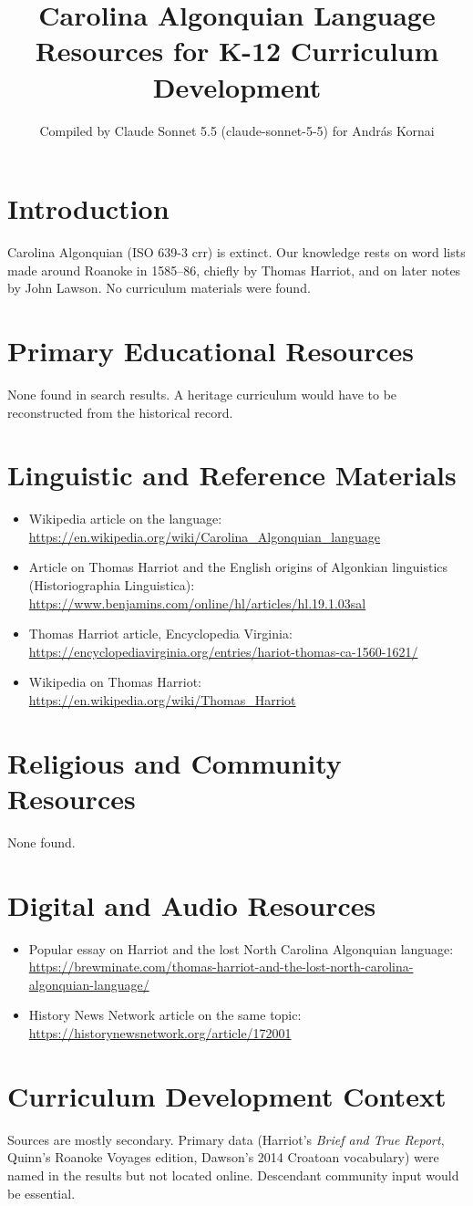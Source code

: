 \documentclass[12pt]{article}
\title{Carolina Algonquian Language Resources for K-12 Curriculum Development}
\author{Compiled by Claude Sonnet 5.5 (claude-sonnet-5-5) for Andr\'as Kornai}
\date{}
\begin{document}
\maketitle
\section{Introduction}
Carolina Algonquian (ISO 639-3 crr) is extinct. Our knowledge rests on word lists made around Roanoke in 1585--86, chiefly by Thomas Harriot, and on later notes by John Lawson. No curriculum materials were found.
\section{Primary Educational Resources}
None found in search results. A heritage curriculum would have to be reconstructed from the historical record.
\section{Linguistic and Reference Materials}
\begin{itemize}
\item Wikipedia article on the language: \url{https://en.wikipedia.org/wiki/Carolina_Algonquian_language}
\item Article on Thomas Harriot and the English origins of Algonkian linguistics (Historiographia Linguistica): \url{https://www.benjamins.com/online/hl/articles/hl.19.1.03sal}
\item Thomas Harriot article, Encyclopedia Virginia: \url{https://encyclopediavirginia.org/entries/hariot-thomas-ca-1560-1621/}
\item Wikipedia on Thomas Harriot: \url{https://en.wikipedia.org/wiki/Thomas_Harriot}
\end{itemize}
\section{Religious and Community Resources}
None found.
\section{Digital and Audio Resources}
\begin{itemize}
\item Popular essay on Harriot and the lost North Carolina Algonquian language: \url{https://brewminate.com/thomas-harriot-and-the-lost-north-carolina-algonquian-language/}
\item History News Network article on the same topic: \url{https://historynewsnetwork.org/article/172001}
\end{itemize}
\section{Curriculum Development Context}
Sources are mostly secondary. Primary data (Harriot's \emph{Brief and True Report}, Quinn's Roanoke Voyages edition, Dawson's 2014 Croatoan vocabulary) were named in the results but not located online. Descendant community input would be essential.
\end{document}
